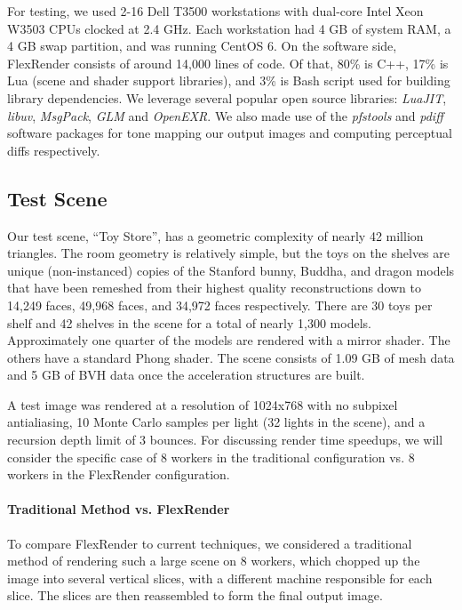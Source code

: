 \documentclass[a4paper,twoside]{article}
\begin{document}
For testing, we used 2-16 Dell T3500 workstations with dual-core Intel Xeon
W3503 CPUs clocked at 2.4 GHz. Each workstation had 4 GB of system RAM, a 4 GB
swap partition, and was running CentOS 6.  On the software side, FlexRender consists of around 14,000 lines of code. Of
that, 80\% is C++, 17\% is Lua (scene and
shader support libraries), and 3\% is Bash script used for building library
dependencies.  We leverage several popular open source libraries: \emph{LuaJIT}, \emph{libuv}, \emph{MsgPack}, \emph{GLM} and \emph{OpenEXR}.  We also made use of the \emph{pfstools} and \emph{pdiff} software packages
for tone mapping our output images and computing perceptual diffs respectively.

\subsection{Test Scene}
\label{toystore}

Our test scene, ``Toy Store'', has a geometric complexity of nearly 42 million
triangles. The room geometry is relatively simple, but the toys on the shelves are unique
(non-instanced) copies of the Stanford bunny, Buddha, and dragon models that
have been remeshed from their highest quality reconstructions down to 14,249
faces, 49,968 faces, and 34,972 faces respectively. There are 30 toys per
shelf and 42 shelves in the scene for a total of nearly 1,300 models. Approximately
one quarter of the models are rendered with a mirror shader. The others have
a standard Phong shader.  The scene consists of 1.09 GB of mesh data and 5 GB of BVH data once the
acceleration structures are built.  

A test  image was rendered at a resolution of 1024x768 with no subpixel antialiasing,
10 Monte Carlo samples per light (32 lights in the scene), and a recursion
depth limit of 3 bounces.  For discussing render time speedups, we will consider the specific case of 8
workers in the traditional configuration vs. 8 workers in the FlexRender
configuration. 

\paragraph{Traditional Method vs. FlexRender}

To compare FlexRender to current techniques, we considered a traditional method of rendering
such a large scene on 8 workers, which chopped up the image into several vertical
slices, with a different machine responsible for each slice. The slices are
then reassembled to form the final output image.
\end{document}
